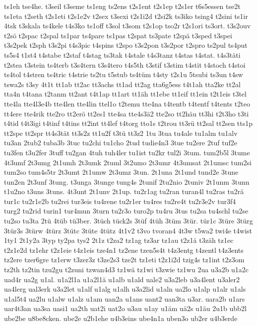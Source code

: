 {ts1eh
tse4he.
t3seil
t3seme
ts1eng
ts2ens
t2s1ent
t2s1ep
t2s1er
t6s5essen
tse2t
ts1eta
t2seth
t2s1eti
t2s1e2v
t2sex
t3sexi
t2s1i2d
t2si2k
ts3iko
tsing4
t2sini
ts1ir
4tsk
t3skala
ts4kele
t4s3ko
ts1off
t3sol
t3som
t2s1op
tso2r
t2s1ori
ts3ort.
t3s2ouv
t2sö
t2spac
t2spal
ts1par
ts4pare
ts1pas
t2spat
ts3pate
t2spä
t3sped
t3spei
t3s2pek
t2sph
t3s2pi
t4s3pic
t4spins
t2spo
t3s2pon
t3s2por
t2spro
ts2pul
ts4put
ts5s4
t1st4
t4stabe
t2staf
t4stag
ts3tak
t4stale
t4s3tanz
t4stas
t4stat.
t4s3täti
t2stea
t3stein
ts4terb
t3s4tern
t3s4tero
t4s5th
t3stif
t3stim
t4stit
t4stoch
t4stoi
ts4tol
t4stren
ts4tric
t4strie
ts2tu
t5stub
ts4tüm
t4sty
t2s1u
5tsubi
ts3un
t4sw
tswa2s
t3sy
4t1t
tt1ab
tt2ac
tt3achs
tt1ad
tt2ag
tta6g5ess
t4t1ah
tta2ke
tt2al
tta4n
t4tana
t2tanm
tt2ant
t4t1ap
tt1art
tt1äh
tt1ebe
tt1eif
tt1ein
t2t1eis
t3tel
tte4la
tte4l3e4b
tte4len
tte4lin
ttel1o
t2temu
tte4na
t4tentb
t4tentf
t4tents
t2teo
tt4ere
tte4rik
tte2ro
tt2erö
tt2es1
tte4sa
tte4s3ä2
tte2so
tt2häu
tt3hi
t2t3ho
t3ti
t4tid
t4t3igi
t4tinf
t4tins
tt2int
tt4lef
t4torg
tto1s
t2trou
tt3rü
tt2sal
tt2sen
tts1p
tt2spe
tt2spr
tt4s3tät
tt3s2z
tt1u2f
t3tü
tt3z2
1tu
3tua
tu4ale
tu1alm
tu1alv
tu3an
2tub2
tuba3b
3tuc
tu2chi
tu1cho
2tud
tudie4n3
3tue
tu2ere
2tuf
tuf2e
tu3fen
t3u2fer
3tuff
tu2gan
4tuh
tuh4ler
tu1ist
tu2kr
tul2i
3tum.
tum2b5l
3tume
4t3umf
2t3umg
2t1umh
2t3umk
2tuml
3t2umo
2t3umr
4t3umsat
2t1umsc
tum2si
tum2so
tum4s5tr
2t3umt
2t1umw
2t3umz
3tun.
2t1una
2t1und
tund2e
3tune
tun2en
2t3unf
3tung.
t3unga
3tunge
tung4s
2tunif
2tu2nio
2tuniv
2t1unm
3tunn
t1u2no
t3uns
3tuns.
4t3unt
2t1unv
2t1up.
tu2r1ag
tu2ran
turan4l
tu2ras
tu2rä
tur1c
tu2r1e2b
tu2rei
tur3eis
tu4rene
tu2r1er
tu4res
tu2re4t
tu2r3e2v
tur3f4
turg2
tu2rid
turin1
tur4mun
3turn
tu2r3o
turo2p
tu4ru
3tus
tu2sa
tu4schl
tu2se
tu2so
tu3ta
2tü
4tüb
tü3ber.
3tüch
tück2s
3tüf
4tüh
3tüm
3tür.
tür1c
3türe
3türg
3tür3s
3türw
4türz
3tütc
3tüte
4tütz
4t1v2
t3vo
tvoran4
4t3w
t5wa2
twi4e
t4wist
1ty1
2t1y2a
3typ
ty2pa
tys2
2t1z
t2za2
tz1ag
tz3ar
tz1au
t2z1ä
t3zäh
tz1ec
t2z1e2d
tz1ehr
t2z1eie
t4z1eis
tze4n1
tz2ene
tzen5s4t
t4z3entg
t4zentl
t4z3ents
tz2ere
tzer6gre
tz1erw
t3zer3z
t3ze2s3
tze2t
tz1eti
t2z1i2d
tzig4s
tz1int
t2z3om
tz2th
tz2tin
tzu2gu
t2zuni
tzwan4d3
tz1wä
tz1wi
t3zwie
tz1wu
2ua
u3a2b
u1a2c
uad4r
ua2g
u1al.
u1a2l1a
u1a2l1ä
u1alb
u1ald
uale2
u3a2leb
u3a4lent
u3aler2
ua4lerg
ual3erk
u3a2let
u1alf
u1alg
u1alh
u3a2lid
u1aln
ua2lo
u1alp
u1alr
u1als
u1al5t4
ua2lu
u1alw
u1alz
u1am
uan2a
u1ans
uant2
uan3ta
u3ar.
uara2b
u1ars
uar4t3an
ua3sa
uasi1
ua2th
uat2i
uat2o
u3au
u1ay
u1äm
uä2s
u1äu
2u1b
ubb2l
ube2be
u8be8cken.
ube2e
u2b1ehe
u4b3eins
ube4n1a
uben3o
ub2er
u4b3erde
}
